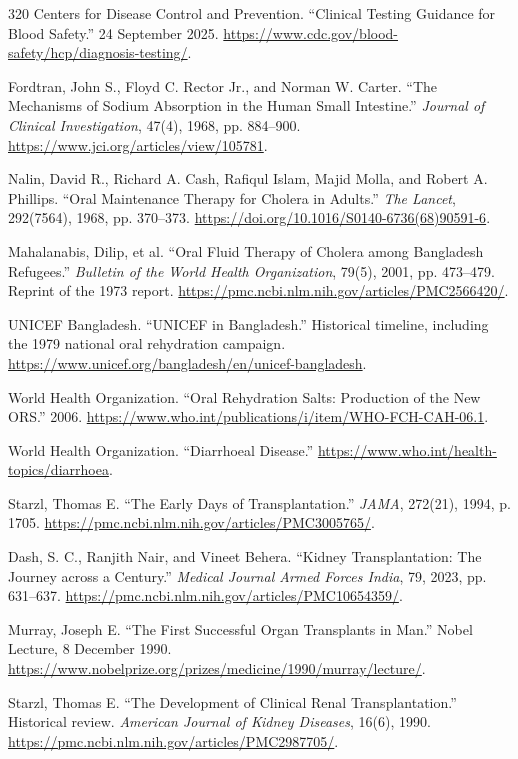 \documentclass[12pt,oneside]{book}
\begin{document}
\begin{thebibliography}{320}
Centers for Disease Control and Prevention. ``Clinical Testing Guidance for
Blood Safety.'' 24 September 2025.
\url{https://www.cdc.gov/blood-safety/hcp/diagnosis-testing/}.

Fordtran, John S., Floyd C. Rector Jr., and Norman W. Carter. ``The Mechanisms
of Sodium Absorption in the Human Small Intestine.'' \emph{Journal of Clinical
Investigation}, 47(4), 1968, pp. 884--900.
\url{https://www.jci.org/articles/view/105781}.

Nalin, David R., Richard A. Cash, Rafiqul Islam, Majid Molla, and Robert A.
Phillips. ``Oral Maintenance Therapy for Cholera in Adults.'' \emph{The
Lancet}, 292(7564), 1968, pp. 370--373.
\url{https://doi.org/10.1016/S0140-6736(68)90591-6}.

Mahalanabis, Dilip, et al. ``Oral Fluid Therapy of Cholera among Bangladesh
Refugees.'' \emph{Bulletin of the World Health Organization}, 79(5), 2001,
pp. 473--479. Reprint of the 1973 report.
\url{https://pmc.ncbi.nlm.nih.gov/articles/PMC2566420/}.

UNICEF Bangladesh. ``UNICEF in Bangladesh.'' Historical timeline, including
the 1979 national oral rehydration campaign.
\url{https://www.unicef.org/bangladesh/en/unicef-bangladesh}.

World Health Organization. ``Oral Rehydration Salts: Production of the New
ORS.'' 2006.
\url{https://www.who.int/publications/i/item/WHO-FCH-CAH-06.1}.

World Health Organization. ``Diarrhoeal Disease.''
\url{https://www.who.int/health-topics/diarrhoea}.

Starzl, Thomas E. ``The Early Days of Transplantation.'' \emph{JAMA},
272(21), 1994, p. 1705.
\url{https://pmc.ncbi.nlm.nih.gov/articles/PMC3005765/}.

Dash, S. C., Ranjith Nair, and Vineet Behera. ``Kidney Transplantation: The
Journey across a Century.''
\emph{Medical Journal Armed Forces India}, 79, 2023, pp. 631--637.
\url{https://pmc.ncbi.nlm.nih.gov/articles/PMC10654359/}.

Murray, Joseph E. ``The First Successful Organ Transplants in Man.'' Nobel
Lecture, 8 December 1990.
\url{https://www.nobelprize.org/prizes/medicine/1990/murray/lecture/}.

Starzl, Thomas E. ``The Development of Clinical Renal Transplantation.''
Historical review. \emph{American Journal of Kidney Diseases}, 16(6), 1990.
\url{https://pmc.ncbi.nlm.nih.gov/articles/PMC2987705/}.


\end{thebibliography}
\end{document}
